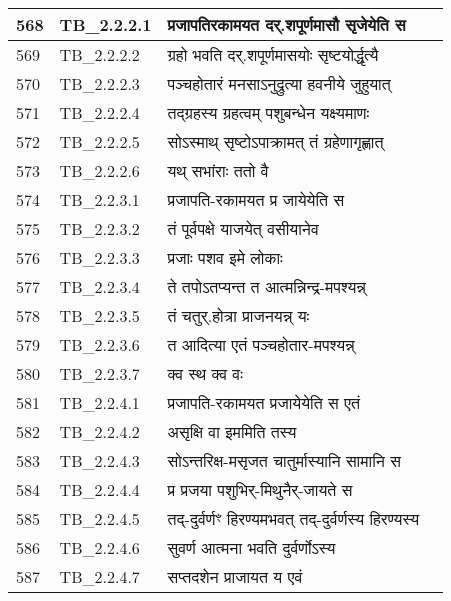 \documentclass[17pt]{extarticle}
\begin{document}
\begin{longtable}{||p{0.4in}||p{0.9in}||p{4.0in}||p{0.9in}||}
        \hline
            568 & TB\_2.2.2.1 & प्रजापतिरकामयत दर्.शपूर्णमासौ सृजेयेति स &      \\
        \hline
            569 & TB\_2.2.2.2 & ग्रहो भवति दर्.शपूर्णमासयोः सृष्टयोर्द्धृत्यै &      \\
        \hline
            570 & TB\_2.2.2.3 & पञ्चहोतारं मनसाऽनुद्रुत्या हवनीये जुहुयात् &      \\
        \hline
            571 & TB\_2.2.2.4 & तद्ग्रहस्य ग्रहत्वम् पशुबन्धेन यक्ष्यमाणः &      \\
        \hline
            572 & TB\_2.2.2.5 & सोऽस्माथ् सृष्टोऽपाक्रामत् तं ग्रहेणागृह्णात् &      \\
        \hline
            573 & TB\_2.2.2.6 & यथ् सभांराः ततो वै &      \\
        \hline
            574 & TB\_2.2.3.1 & प्रजापति{-}रकामयत प्र जायेयेति स &      \\
        \hline
            575 & TB\_2.2.3.2 & तं पूर्वपक्षे याजयेत् वसीयानेव &      \\
        \hline
            576 & TB\_2.2.3.3 & प्रजाः पशव इमे लोकाः &      \\
        \hline
            577 & TB\_2.2.3.4 & ते तपोऽतप्यन्त त आत्मन्निन्द्र{-}मपश्यन्न् &      \\
        \hline
            578 & TB\_2.2.3.5 & तं चतुर्.होत्रा प्राजनयन्न् यः &      \\
        \hline
            579 & TB\_2.2.3.6 & त आदित्या एतं पञ्चहोतार{-}मपश्यन्न् &      \\
        \hline
            580 & TB\_2.2.3.7 & क्व स्थ क्व वः &      \\
        \hline
            581 & TB\_2.2.4.1 & प्रजापति{-}रकामयत प्रजायेयेति स एतं &      \\
        \hline
            582 & TB\_2.2.4.2 & असृक्षि वा इममिति तस्य &      \\
        \hline
            583 & TB\_2.2.4.3 & सोऽन्तरिक्ष{-}मसृजत चातुर्मास्यानि सामानि स &      \\
        \hline
            584 & TB\_2.2.4.4 & प्र प्रजया पशुभिर्{-}मिथुनैर्{-}जायते स &      \\
        \hline
            585 & TB\_2.2.4.5 & तद्{-}दुर्वर्णꣳ हिरण्यमभवत् तद्{-}दुर्वर्णस्य हिरण्यस्य &      \\
        \hline
            586 & TB\_2.2.4.6 & सुवर्ण आत्मना भवति दुर्वर्णोऽस्य &      \\
        \hline
            587 & TB\_2.2.4.7 & सप्तदशेन प्राजायत य एवं &      \\

\end{longtable}
\end{document}
